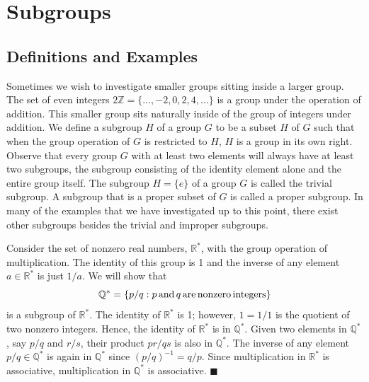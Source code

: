  
 
 
\section{Subgroups}\label{groups_section_3}
 
 
\subsection*{Definitions and Examples}
 
 
Sometimes we wish to investigate smaller groups sitting
inside a larger group.   The set of even integers $2{\mathbb Z} = \{
\ldots, -2, 0, 2, 4, \ldots \}$ is a group  under the operation of
addition. This smaller group sits naturally inside of the group of
integers under addition.  We define a {\bfi
subgroup} $H$ of a group $G$ to be a
subset $H$ of $G$ such that when the group operation of $G$ is
restricted to $H$, $H$ is a group in its own right. 
Observe that every group $G$ with at least two elements will always
have at least two subgroups, the subgroup consisting of the identity
element alone and the entire group itself. The subgroup $H = \{ e \}$
of a group $G$ is called the {\bfi trivial
subgroup}.  A subgroup that is a proper subset
of $G$ is called a {\bfi proper subgroup}. In
many of the examples that we have investigated up to this point, there
exist other subgroups besides the trivial and improper subgroups.  
 
 
\medskip
 
 
Consider the set of nonzero real numbers, ${\mathbb
R}^*$\label{noteRstar}, with the group operation of multiplication.
The identity of this group is 1 and the inverse of any element $a \in
{\mathbb R}^*$ is just $1/a$. We will  show  that
$$
{\mathbb Q}^*\label{noteQstar} = \{ p/q : p \, {\rm
and }\, q\, {\rm are\, nonzero\, integers} \}
$$
is a subgroup of ${\mathbb R}^*$. The identity of ${\mathbb R}^*$ is 1;
however,  $1 = 1/1$ is the quotient of two nonzero integers. Hence,
the identity of ${\mathbb R}^*$ is in ${\mathbb Q}^*$. Given two elements in
${\mathbb Q}^*$, say $p/q$ and $r/s$, their product $pr/qs$ is also in
${\mathbb Q}^*$. The inverse of any element $p/q \in {\mathbb Q}^*$ is again
in ${\mathbb Q}^*$ since $(p/q)^{-1} = q/p$. Since multiplication in
${\mathbb R}^*$ is associative, multiplication in ${\mathbb Q}^*$ is
associative. 
\hspace{\fill} $\blacksquare$
 
